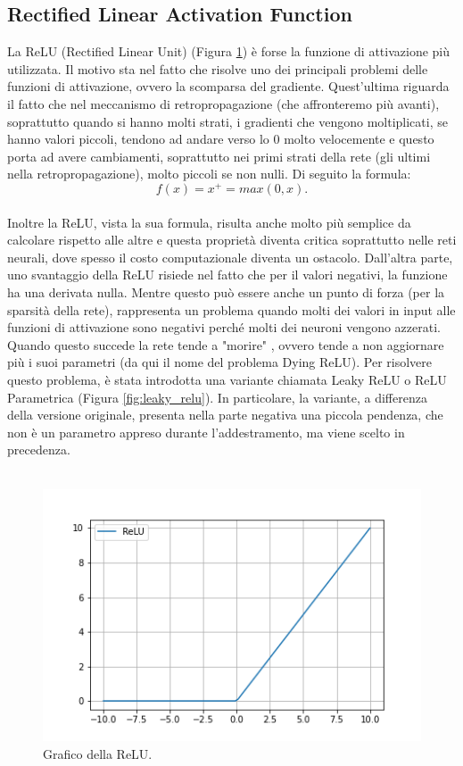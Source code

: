 \subsection{Rectified Linear Activation Function}
La ReLU (Rectified Linear Unit) (Figura \ref{fig:relu}) è forse la funzione di attivazione più utilizzata. Il motivo sta nel fatto che risolve uno dei principali problemi delle funzioni di attivazione, ovvero la scomparsa del gradiente. Quest'ultima riguarda il fatto che nel meccanismo di retropropagazione (che affronteremo più avanti), soprattutto quando si hanno molti strati, i gradienti che vengono moltiplicati, se hanno valori piccoli, tendono ad andare verso lo 0 molto velocemente e questo porta ad avere cambiamenti, soprattutto nei primi strati della rete (gli ultimi nella retropropagazione), molto piccoli se non nulli. Di seguito la formula:
\\
\begin{equation}
  f(x) = x^{+} = max(0,x).
\end{equation}
\\
Inoltre la ReLU, vista la sua formula, risulta anche molto più semplice da calcolare rispetto alle altre e questa proprietà diventa critica soprattutto nelle reti neurali, dove spesso il costo computazionale diventa un ostacolo. Dall’altra parte, uno svantaggio della ReLU risiede nel fatto che per il valori negativi, la funzione ha una derivata nulla. Mentre questo può essere anche un punto di forza (per la sparsità della rete), rappresenta un problema quando molti dei valori in input alle funzioni di attivazione sono negativi perché molti dei neuroni vengono azzerati. Quando questo succede la rete tende a "morire" , ovvero tende a non aggiornare più i suoi parametri (da qui il nome del problema Dying ReLU).
Per risolvere questo problema, è stata introdotta una variante chiamata Leaky ReLU o ReLU Parametrica (Figura \ref{fig:leaky_relu}). In particolare, la variante, a differenza della versione originale, presenta nella parte negativa una piccola pendenza, che non è un parametro appreso durante l’addestramento, ma viene scelto in precedenza.\\ \\



\begin{figure}[h!]
  \hspace*{0.9in}
  \includegraphics[scale=0.6]{img/relu.png}
  \caption{Grafico della ReLU.}
  \label{fig:relu}
\end{figure}


